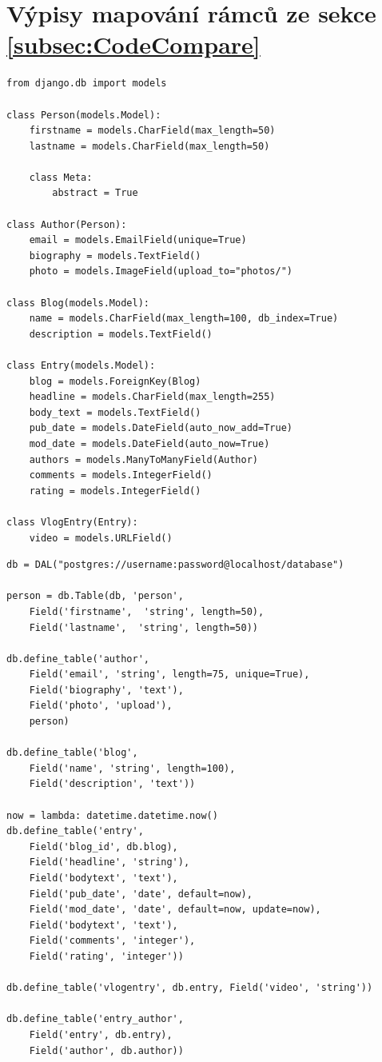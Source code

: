 \documentclass[ing,male,java,dept456]{diploma}						%
\begin{document}
\appendix
\section{Výpisy mapování rámců ze sekce \ref{subsec:CodeCompare}}
\label{sec:ApendixMapping}
\begin{lstlisting}[style=custompython, emphstyle={\bfseries}, label=src:Mapping, caption=Schéma jednoduché aplikace pro vytváření blogů v Django ORM]
from django.db import models

class Person(models.Model):
    firstname = models.CharField(max_length=50)
    lastname = models.CharField(max_length=50)

    class Meta:
        abstract = True

class Author(Person):
    email = models.EmailField(unique=True)
    biography = models.TextField()
    photo = models.ImageField(upload_to="photos/")

class Blog(models.Model):
    name = models.CharField(max_length=100, db_index=True)
    description = models.TextField()

class Entry(models.Model):
    blog = models.ForeignKey(Blog)
    headline = models.CharField(max_length=255)
    body_text = models.TextField()
    pub_date = models.DateField(auto_now_add=True)
    mod_date = models.DateField(auto_now=True)
    authors = models.ManyToManyField(Author)
    comments = models.IntegerField()
    rating = models.IntegerField()

class VlogEntry(Entry):
    video = models.URLField()

\end{lstlisting}
\clearpage

\begin{lstlisting}[style=custompython, label=src:w2p-mapping, caption=Schéma jednoduché aplikace pro vytváření blogů ve web2py DBAL]
db = DAL("postgres://username:password@localhost/database")

person = db.Table(db, 'person',
    Field('firstname',  'string', length=50),
    Field('lastname',  'string', length=50))

db.define_table('author', 
    Field('email', 'string', length=75, unique=True), 
    Field('biography', 'text'),
    Field('photo', 'upload'),
    person)
    
db.define_table('blog', 
    Field('name', 'string', length=100), 
    Field('description', 'text'))

now = lambda: datetime.datetime.now()
db.define_table('entry', 
    Field('blog_id', db.blog), 
    Field('headline', 'string'),
    Field('bodytext', 'text'),
    Field('pub_date', 'date', default=now),
    Field('mod_date', 'date', default=now, update=now),
    Field('bodytext', 'text'),
    Field('comments', 'integer'),
    Field('rating', 'integer'))
    
db.define_table('vlogentry', db.entry, Field('video', 'string'))

db.define_table('entry_author',
    Field('entry', db.entry),
    Field('author', db.author))
\end{lstlisting}
\clearpage
\end{document}
